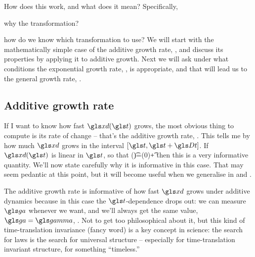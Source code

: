 How does this work, and what does it mean? Specifically, 
\bi
\item[1.]
why the transformation? 
\item[2.]
how do we know which transformation to use?
\ei
We will start with the mathematically simple case of the additive growth rate, , and discuss its properties by applying it to additive growth. Next we will ask under what conditions the exponential growth rate, , is appropriate, and that will lead us to the general growth rate, .


\subsection{Additive growth rate}
If I want to know how fast $\xd(\t)$ grows, the most obvious thing to compute is its rate of change -- that's the additive growth rate, .
This tells me by how much $\xd$ grows in the interval $[\t,\t+\Dt]$. If $\xd(\t)$ is linear in $\t$, so that 
\be
\xd(\t)=\xd(0)+\ggamma \t
{}
\ee
then this is a very informative quantity. We'll now state carefully why it is informative in this case. That may seem pedantic at this point, but it will become useful when we generalise in  and . 

The additive growth rate  is informative of how fast $\xd$ grows under additive 
dynamics  because in this case the $\t$-dependence drops out: we can measure 
$\gad$ whenever we want, and we'll always get the same value, $\gad=\ggamma$, . Not to get 
too philosophical about it, but this kind of time-translation invariance (fancy word) is a key 
concept in science: the search for laws is the search for universal structure -- especially for 
time-translation invariant structure, for something ``timeless.''

